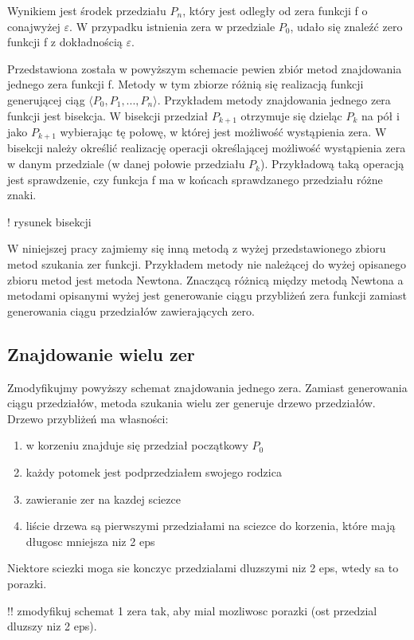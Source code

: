 \documentclass[11pt,a4paper,oneside]{report}
\begin{document}
Wynikiem jest środek przedziału $P_n$, który jest odległy od zera funkcji f o conajwyżej $\varepsilon$. W przypadku istnienia zera w przedziale $P_0$, udało się znaleźć zero funkcji f z dokładnością $\varepsilon$.

Przedstawiona została w powyższym schemacie pewien zbiór metod znajdowania jednego zera funkcji f. Metody w tym zbiorze różnią się realizacją funkcji generującej ciąg $\langle P_0, P_1, ..., P_n\rangle$.
Przykładem metody znajdowania jednego zera funkcji jest bisekcja. W bisekcji przedział $P_{k+1}$ otrzymuje się dzieląc $P_k$ na pół i jako $P_{k+1}$ wybierając tę połowę, w której jest możliwość wystąpienia zera. W bisekcji należy określić realizację operacji określającej możliwość wystąpienia zera w danym przedziale (w danej połowie przedziału $P_k$). Przykładową taką operacją jest sprawdzenie, czy funkcja f ma w końcach sprawdzanego przedziału różne znaki.

! rysunek bisekcji

W niniejszej pracy zajmiemy się inną metodą z wyżej przedstawionego zbioru metod szukania zer funkcji. Przykładem metody nie należącej do wyżej opisanego zbioru metod jest metoda Newtona. Znaczącą różnicą między metodą Newtona a metodami opisanymi wyżej jest generowanie ciągu przybliżeń zera funkcji zamiast generowania ciągu przedziałów zawierających zero.

\subsection{Znajdowanie wielu zer}

Zmodyfikujmy powyższy schemat znajdowania jednego zera. Zamiast generowania ciągu przedziałów, metoda szukania wielu zer generuje drzewo przedziałów. Drzewo przybliżeń ma własności:
\begin{enumerate}
\item w korzeniu znajduje się przedział początkowy $P_0$
\item każdy potomek jest podprzedziałem swojego rodzica
\item zawieranie zer na kazdej sciezce
\item liście drzewa są pierwszymi przedziałami na sciezce do korzenia, które mają długosc mniejsza niz 2 eps
\end{enumerate}

Niektore sciezki moga sie konczyc przedzialami dluzszymi niz 2 eps, wtedy sa to porazki.

!! zmodyfikuj schemat 1 zera tak, aby mial mozliwosc porazki (ost przedzial dluzszy niz 2 eps).
\end{document}
